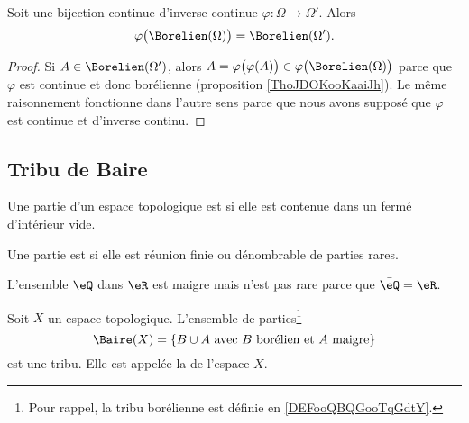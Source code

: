 \begin{proposition}
	Soit une bijection continue d'inverse continue \( \varphi\colon \Omega\to \Omega'\). Alors
	\begin{equation}
		\varphi\big( \Borelien(\Omega) \big)=\Borelien(\Omega').
	\end{equation}
\end{proposition}

\begin{proof}
	Si \( A\in \Borelien(\Omega')\), alors \( A=\varphi\big( \varphi(A) \big)\in\varphi\big( \Borelien(\Omega) \big)\) parce que \( \varphi\) est continue et donc borélienne (proposition \ref{ThoJDOKooKaaiJh}). Le même raisonnement fonctionne dans l'autre sens parce que nous avons supposé que \( \varphi\) est continue et d'inverse continu.
\end{proof}

\subsection{Tribu de Baire}

\begin{definition}
	Une partie d'un espace topologique est  si elle est contenue dans un fermé d'intérieur vide.

	Une partie est  si elle est réunion finie ou dénombrable de parties rares.
\end{definition}

\begin{example}
	L'ensemble \( \eQ\) dans \( \eR\) est maigre mais n'est pas rare parce que \( \bar\eQ=\eR\).
\end{example}

\begin{proposition}      \label{PROPooCHTWooZFiSMf}
	Soit \( X\) un espace topologique. L'ensemble de parties\footnote{Pour rappel, la tribu borélienne est définie en \ref{DEFooQBQGooTqGdtY}.}
	\begin{equation}
		\Baire(X)=\{ B\cup A\text{ avec } B\text{ borélien et } A\text{ maigre} \}
	\end{equation}
	est une tribu. Elle est appelée la  de l'espace \( X\).
\end{proposition}

